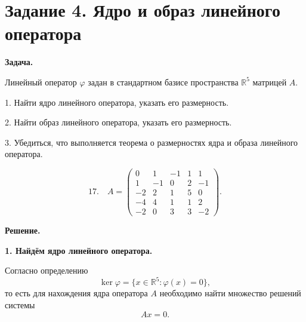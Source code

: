 \section{Задание 4. Ядро и образ линейного оператора}

\textbf{Задача.}

Линейный оператор $\varphi$ задан в стандартном базисе пространства $\mathbb{R}^5$ матрицей $A$.

1. Найти ядро линейного оператора, указать его размерность.

2. Найти образ линейного оператора, указать его размерность.

3. Убедиться, что выполняется теорема о размерностях ядра и образа линейного оператора.

\[
17.\quad
A=
\begin{pmatrix}
0 & 1 & -1 & 1 & 1\\
1 & -1 & 0 & 2 & -1\\
-2 & 2 & 1 & 5 & 0\\
-4 & 4 & 1 & 1 & 2\\
-2 & 0 & 3 & 3 & -2
\end{pmatrix}.
\]

\textbf{Решение.}

\textbf{1. Найдём ядро линейного оператора.}

Согласно определению
\[
\ker\varphi=\{x\in\mathbb{R}^5:\varphi(x)=0\},
\]
то есть для нахождения ядра оператора $A$ необходимо найти множество решений системы
\[
Ax=0.
\]

